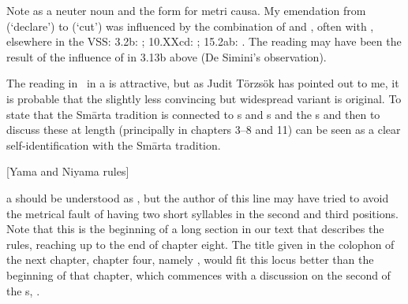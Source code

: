 { Note  as a neuter noun and the form  for  metri causa.          My emendation from  (`declare') to  (`cut') was influenced by the combination         of  and , often with , elsewhere in the VSS:                 3.2b: ;                  10.XXcd: ;                 15.2ab: .                  The reading  may have been the result of the influence of  in 3.13b above                  (De Simini's observation). }





{ The reading  in \msNc\ in  a is attractive, but as Judit                          Törzsök has pointed out to me, it is probable that                         the slightly less convincing but widespread variant  is original.  To state that the Smārta tradition is connected to s and s and the s and         then to discuss these at length (principally in chapters 3--8 and 11) can be seen                                  as a clear self-identification with the Smārta tradition. }




\begin{center}
{{[Yama and Niyama rules]}}
\end{center}




{  a should be understood as , but the author of this line                 may have tried to avoid the metrical fault of having two short syllables in the second and third positions.  Note that this is the beginning of a long section in our text         that describes the  rules, reaching up to the end of chapter eight.          The title given in the colophon of the next chapter, chapter four, namely ,         would fit this locus better than the beginning of that chapter, which          commences with a discussion on the second of the s, . }





